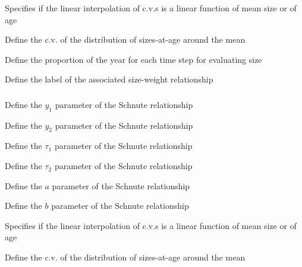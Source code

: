  {Specifies if the linear interpolation of c.v.s is a linear function of mean size or of age}

 {Define the c.v. of the distribution of sizes-at-age around the mean}

 {Define the proportion of the year for each time step for evaluating size}

 {Define the label of the associated size-weight relationship}

\subsubsection[Schnute]{}

 {Define the $y_1$ parameter of the Schnute relationship}

 {Define the $y_2$ parameter of the Schnute relationship}

 {Define the $\tau_1$ parameter of the Schnute relationship}

 {Define the $\tau_2$ parameter of the Schnute relationship}

 {Define the $a$ parameter of the Schnute relationship}

 {Define the $b$ parameter of the Schnute relationship}

 {Specifies if the linear interpolation of c.v.s is a linear function of mean size or of age}

 {Define the c.v. of the distribution of sizes-at-age around the mean}

